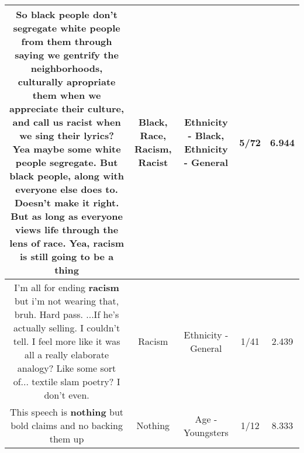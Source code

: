 \documentclass[11pt]{article}
\newlength\mylength
\begin{document}
\begin{center}
\begin{longtable}{|C{.65\mylength}|C{.30\mylength}|C{.12\mylength}|C{.12\mylength}|C{.12\mylength}|}
  \small So \textbf{black} people don't segregate white people from them through saying we gentrify the neighborhoods, culturally apropriate them when we appreciate their culture, and call us \textbf{racist} when we sing their lyrics? Yea maybe some white people segregate. But \textbf{black} people, along with everyone else does to. Doesn't make it right. But as long as everyone views life through the lens of \textbf{race}. Yea, \textbf{racism} is still going to be a thing\normalsize   & Black, Race, Racism, Racist & Ethnicity - Black, Ethnicity - General & 5/72 & 6.944 \\  \hline
  \small I'm all for ending \textbf{racism} but i'm not wearing that, bruh. Hard pass. ...If he's actually selling. I couldn't tell. I feel more like it was all a really elaborate analogy? Like some sort of... textile slam poetry? I don't even.\normalsize   & Racism & Ethnicity - General & 1/41 & 2.439 \\  \hline
  \small This speech is \textbf{nothing} but bold claims and no backing them up\normalsize   & Nothing & Age - Youngsters & 1/12 & 8.333 \\  \hline

\end{longtable}
\end{center}
\end{document}
